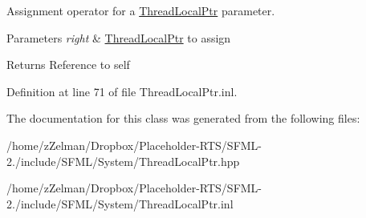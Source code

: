 Assignment operator for a \hyperlink{classsf_1_1ThreadLocalPtr}{Thread\-Local\-Ptr} parameter. 


\begin{DoxyParams}{Parameters}
{\em right} & \hyperlink{classsf_1_1ThreadLocalPtr}{Thread\-Local\-Ptr} to assign\\
\hline
\end{DoxyParams}
\begin{DoxyReturn}{Returns}
Reference to self 
\end{DoxyReturn}


Definition at line 71 of file Thread\-Local\-Ptr.\-inl.



The documentation for this class was generated from the following files\-:\begin{DoxyCompactItemize}
\item 
/home/z\-Zelman/\-Dropbox/\-Placeholder-\/\-R\-T\-S/\-S\-F\-M\-L-\/2./include/\-S\-F\-M\-L/\-System/Thread\-Local\-Ptr.\-hpp\item 
/home/z\-Zelman/\-Dropbox/\-Placeholder-\/\-R\-T\-S/\-S\-F\-M\-L-\/2./include/\-S\-F\-M\-L/\-System/Thread\-Local\-Ptr.\-inl\end{DoxyCompactItemize}
